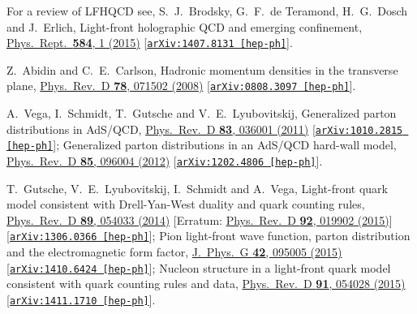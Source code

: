 \documentclass[aps,prd,preprint,groupedaddress]{revtex4-1}
\begin{document}
\begin{thebibliography}{99}
 For a review of LFHQCD see, S.~J.~Brodsky, G.~F.~de Teramond, H.~G.~Dosch and J.~Erlich,
 Light-front holographic QCD and emerging confinement,
 \href{http://www.sciencedirect.com/science/article/pii/S0370157315002306}{Phys.\ Rept.\  {\bf 584}, 1 (2015)}
 [\href{http://arxiv.org/abs/1407.8131}{\tt arXiv:1407.8131 [hep-ph]}].


   Z.~Abidin and C.~E.~Carlson,
  Hadronic momentum densities in the transverse plane,
  \href{https://journals.aps.org/prd/abstract/10.1103/PhysRevD.78.071502}{Phys.\ Rev.\ D {\bf 78}, 071502 (2008)}
  [\href{https://arxiv.org/abs/0808.3097}{\tt arXiv:0808.3097 [hep-ph]}].


  A.~Vega, I.~Schmidt, T.~Gutsche and V.~E.~Lyubovitskij,
  Generalized parton distributions in AdS/QCD,
  \href{https://journals.aps.org/prd/abstract/10.1103/PhysRevD.83.036001}{Phys.\ Rev.\ D {\bf 83}, 036001 (2011)}
  [\href{https://arxiv.org/abs/1010.2815}{\tt arXiv:1010.2815 [hep-ph]}];
  Generalized parton distributions in an AdS/QCD hard-wall model,
  \href{https://journals.aps.org/prd/abstract/10.1103/PhysRevD.85.096004}{Phys.\ Rev.\ D {\bf 85}, 096004 (2012)}
  [\href{https://arxiv.org/abs/1202.4806}{\tt arXiv:1202.4806 [hep-ph]}].


  T.~Gutsche, V.~E.~Lyubovitskij, I.~Schmidt and A.~Vega,
  Light-front quark model consistent with Drell-Yan-West duality and quark counting rules,
  \href{https://journals.aps.org/prd/abstract/10.1103/PhysRevD.89.054033}{Phys.\ Rev.\ D {\bf 89},  054033 (2014)}
  [Erratum: \href{https://journals.aps.org/prd/abstract/10.1103/PhysRevD.92.019902}{Phys.\ Rev.\ D {\bf 92}, 019902 (2015)}]
  [\href{https://arxiv.org/abs/1411.1710}{\tt arXiv:1306.0366 [hep-ph]}];
  Pion light-front wave function, parton distribution and the electromagnetic form factor,
  \href{http://iopscience.iop.org/article/10.1088/0954-3899/42/9/095005/meta;jsessionid=29360E23C1D7E8AC2FB3E30661060B97.c2.iopscience.cld.iop.org}{J.\ Phys.\ G {\bf 42},  095005 (2015)}
  [\href{https://arxiv.org/abs/1410.6424}{\tt arXiv:1410.6424 [hep-ph]}];
  Nucleon structure in a light-front quark model consistent with quark counting rules and data,
  \href{https://journals.aps.org/prd/abstract/10.1103/PhysRevD.91.054028}{Phys.\ Rev.\ D {\bf 91}, 054028 (2015)}
  [\href{https://arxiv.org/abs/1411.1710}{\tt arXiv:1411.1710 [hep-ph]}].



\end{thebibliography}
\end{document}
